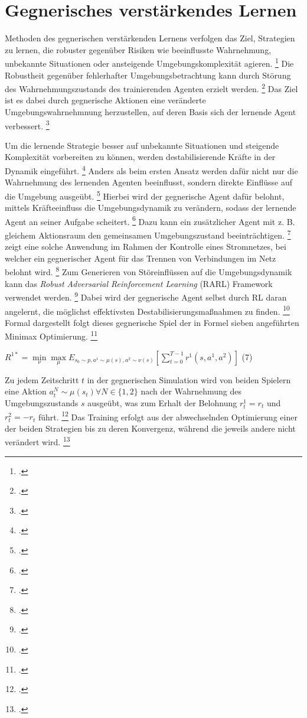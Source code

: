 \section{Gegnerisches verstärkendes Lernen}
Methoden des gegnerischen verstärkenden Lernens verfolgen das Ziel, Strategien zu lernen, die robuster gegenüber Risiken wie beeinflusste Wahrnehmung, unbekannte Situationen oder ansteigende Umgebungskomplexität agieren. \footcite[Vgl.][S. 2]{Schott.2022}
Die Robustheit gegenüber fehlerhafter Umgebungsbetrachtung kann durch Störung des Wahrnehmungszustands des trainierenden Agenten erzielt werden. \footcite[Vgl.][S. 2]{Schott.2022}
Das Ziel ist es dabei durch gegnerische Aktionen eine veränderte Umgebungswahrnehmnung herzustellen, auf deren Basis sich der lernende Agent verbessert. \footcite[Vgl.][S. 3]{Schott.2022}

Um die lernende Strategie besser auf unbekannte Situationen und steigende Komplexität vorbereiten zu können, werden destabilisierende Kräfte in der Dynamik eingeführt. \footcite[Vgl.][S. 1]{Pinto.2017}
Anders als beim ersten Ansatz werden dafür nicht nur die Wahrnehmung des lernenden Agenten beeinflusst, sondern direkte Einflüsse auf die Umgebung ausgeübt. \footcite[Vgl.][S. 2]{Schott.2022}
Hierbei wird der gegnerische Agent dafür belohnt, mittels Kräfteeinfluss die Umgebungsdynamik zu verändern, sodass der lernende Agent an seiner Aufgabe scheitert. \footcite[Vgl.][S. 2]{Pinto.2017}
Dazu kann ein zusätzlicher Agent mit z. B. gleichem Aktionsraum den gemeinsamen Umgebungszustand beeinträchtigen. \footcite[Vgl.][S. 2]{Pinto.2017}
\cite[]{Pan.2021} zeigt eine solche Anwendung im Rahmen der Kontrolle eines Stromnetzes, bei welcher ein gegnerischer Agent für das Trennen von Verbindungen im Netz belohnt wird. \footcite[Vgl.][S. 2]{Pan.2021}
Zum Generieren von Störeinflüssen auf die Umgebungsdynamik kann das \textit{Robust Adversarial Reinforcement Learning} (RARL) Framework verwendet werden. \footcite[Vgl.][S. 2]{Schott.2022}
Dabei wird der gegnerische Agent selbst durch RL daran angelernt, die möglichst effektivsten Destabilisierungsmaßnahmen zu finden. \footcite[Vgl.][S. 1]{Pinto.2017}
Formal dargestellt folgt dieses gegnerische Spiel der in Formel sieben angeführten Minimax Optimierung. \footcite[Vgl.][S. 3]{Pinto.2017}
\begin{description}
    \item \begin{center} $R^{1*} = \underset{\nu}{\min}\underset{\mu}{\max} E_{s_{0}\sim p,a^{1}\sim\mu(s),a^{2}\sim\nu(s)} [\sum_{t=0}^{T-1} r^{1} (s,a^{1},a^{2})]$ (7)\end{center} 
\end{description}
Zu jedem Zeitschritt $t$ in der gegnerischen Simulation wird von beiden Spielern eine Aktion $a_{t}^{N} \sim \mu(s_{t}) \forall N \in \{1,2\}$ nach der Wahrnehmung des Umgebungszustands $s$ ausgeübt, was zum Erhalt der Belohnung $r_{t}^{1} = r_{t}$ und $r_{t}^{2} = -r_{t}$ führt. \footcite[Vgl.][S. 3f.]{Pinto.2017}
Das Training erfolgt aus der abwechselnden Optimierung einer der beiden Strategien bis zu deren Konvergenz, während die jeweils andere nicht verändert wird. \footcite[Vgl.][S. 4]{Pinto.2017}

